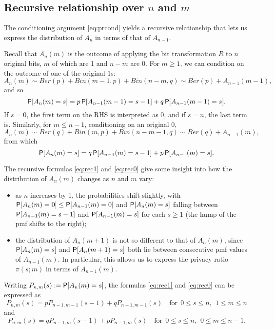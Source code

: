 \documentclass[11pt,draft]{article}
\begin{document}
\subsection{Recursive relationship over $n$ and $m$}

The conditioning argument \eqref{eq:prcond} yields a recursive relationship that lets us express the distribution of $A_n$ in terms of that of $A_{n-1}$.

Recall that $A_n(m)$ is the outcome of applying the bit transformation $R$ to $n$ original bits, $m$ of which are 1 and $n-m$ are 0.
For $m \geq 1$, we can condition on the outcome of one of the original 1s:
\[ A_n(m) \sim Ber(p) + Bin(m-1, p) + Bin(n-m, q) \sim Ber(p) + A_{n-1}(m-1), \]
and so
\begin{equation}\label{eq:rec1}
\P[A_n(m) = s] = p\P[A_{n-1}(m-1) = s-1] + q\P[A_{n-1}(m-1) = s].
\end{equation}
If $s = 0$, the first term on the RHS is interpreted as 0, and if $s = n$, the last term is.
Similarly, for $m \leq n-1$, conditioning on an original 0,
\[ A_n(m) \sim Ber(q) + Bin(m, p) + Bin(n-m-1, q) \sim Ber(q) + A_{n-1}(m), \]
from which
\begin{equation}\label{eq:rec0}
\P[A_n(m) = s] = q\P[A_{n-1}(m) = s-1] + p\P[A_{n-1}(m) = s].
\end{equation}

The recursive formulas \eqref{eq:rec1} and \eqref{eq:rec0} give some insight into how the distribution of $A_n(m)$ changes as $n$ and $m$ vary:
\begin{itemize}
\item  as $n$ increases by 1, the probabilities shift slightly, with $\P[A_n(m) = 0] \leq \P[A_{n-1}(m) = 0]$ and
$\P[A_n(m) = s]$ falling between $\P[A_{n-1}(m) = s-1]$ and $\P[A_{n-1}(m) = s]$ for each $s\geq 1$ (\ie the hump of the pmf shifts to the right);
\item the distribution of $A_n(m+1)$ is not so different to that of $A_n(m)$, since $\P[A_n(m) = s]$ and $\P[A_n(m+1) = s]$ both lie between consecutive pmf values of $A_{n-1}(m)$. In particular, this allows us to express the privacy ratio $\pi(s;m)$ in terms of $A_{n-1}(m)$.
\end{itemize}

Writing $P_{n,m}(s) := \P[A_n(m) = s]$, the formulas \eqref{eq:rec1} and \eqref{eq:rec0} can be expressed as
\[ P_{n,m}(s) = pP_{n-1,m-1}(s-1) + qP_{n-1,m-1}(s)
\quad\text{for}\ \ 0 \leq s \leq n,\ \ 1\leq m \leq n 
\]
and
\[ P_{n,m}(s) = qP_{n-1,m}(s-1) + pP_{n-1,m}(s)
\quad\text{for}\ \ 0 \leq s \leq n,\ \ 0\leq m \leq n-1.
\]
\end{document}
